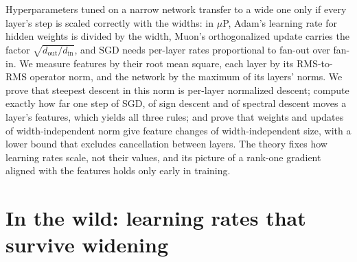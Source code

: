 \newcommand{\modularh}{d_{\mathrm h}}
\newcommand{\modularin}{d_{\mathrm{in}}}
\newcommand{\modularout}{d_{\mathrm{out}}}

\begin{refsection}

\begin{chaptersummary}
Hyperparameters tuned on a narrow network transfer to a wide one only if every layer's step is scaled correctly with the widths: in $\mu$P, Adam's learning rate for hidden weights is divided by the width, Muon's orthogonalized update carries the factor $\sqrt{\modularout/\modularin}$, and SGD needs per-layer rates proportional to fan-out over fan-in. We measure features by their root mean square, each layer by its RMS-to-RMS operator norm, and the network by the maximum of its layers' norms. We prove that steepest descent in this norm is per-layer normalized descent; compute exactly how far one step of SGD, of sign descent and of spectral descent moves a layer's features, which yields all three rules; and prove that weights and updates of width-independent norm give feature changes of width-independent size, with a lower bound that excludes cancellation between layers. The theory fixes how learning rates scale, not their values, and its picture of a rank-one gradient aligned with the features holds only early in training.
\end{chaptersummary}

\section{In the wild: learning rates that survive widening}\label{sec:modular:wild}


\end{refsection}
